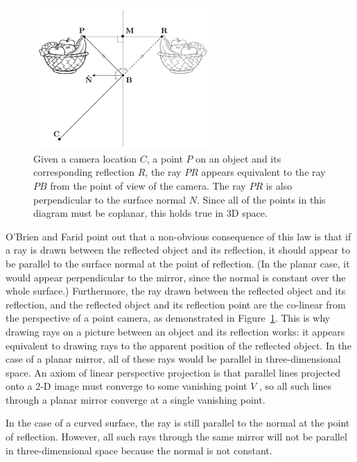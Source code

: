 \documentclass{article}
\begin{document}
\begin{figure}
	\centering
    	\includegraphics[width=0.6\textwidth]{normal-reflection}
	\caption{Given a camera location $C$, a point $P$ on an object and its corresponding reflection $R$, the ray $PR$ appears equivalent to the ray $PB$ from the point of view of the camera. The ray $PR$ is also perpendicular to the surface normal $N$. Since all of the points in this diagram must be coplanar, this holds true in 3D space. \cite{obrien12}}
	\label{normal-reflection}
\end{figure}

O'Brien and Farid point out that a non-obvious consequence of this law is that if a ray is drawn between the reflected object and its reflection, it should appear to be parallel to the surface normal at the point of reflection. (In the planar case, it would appear perpendicular to the mirror, since the normal is constant over the whole surface.) Furthermore, the ray drawn between the reflected object and its reflection, and the reflected object and its reflection point are the co-linear from the perspective of a point camera, as demonstrated in Figure~\ref{normal-reflection}. This is why drawing rays on a picture between an object and its reflection works: it appears equivalent to drawing rays to the apparent position of the reflected object. In the case of a planar mirror, all of these rays would be parallel in three-dimensional space.\nocite{obrien12} An axiom of linear perspective projection is that parallel lines projected onto a 2-D image must converge to some vanishing point $V$ \cite[p.~2]{hartley}, so all such lines through a planar mirror converge at a single vanishing point.

In the case of a curved surface, the ray is still parallel to the normal at the point of reflection. However, all such rays through the same mirror will not be parallel in three-dimensional space because the normal is not constant.
\end{document}
